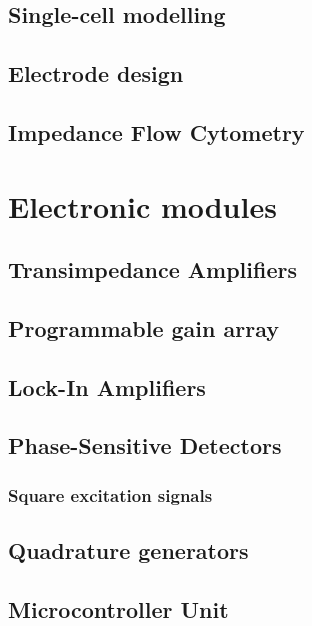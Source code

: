 \documentclass{ucetd}
\begin{document}
\section{Single-cell modelling}
\label{sec:CellModel}

\section{Electrode design}
\label{sec:ElectrodeDesign}

\section{Impedance Flow Cytometry}
\label{sec:IFC}


\chapter{Electronic modules}
\label{chap:Electronics}

\section{Transimpedance Amplifiers}
\label{sec:TIA}

\section{Programmable gain array}
\label{sec:PGA}

\section{Lock-In Amplifiers}
\label{sec:LIA}

\section{Phase-Sensitive Detectors}
\label{sec:PSD}

\subsection{Square excitation signals}
\label{sub:SquareSignal}

\section{Quadrature generators}
\label{sec:QuadratureGenerator}

\section{Microcontroller Unit}
\label{sec:MCU}

\end{document}
